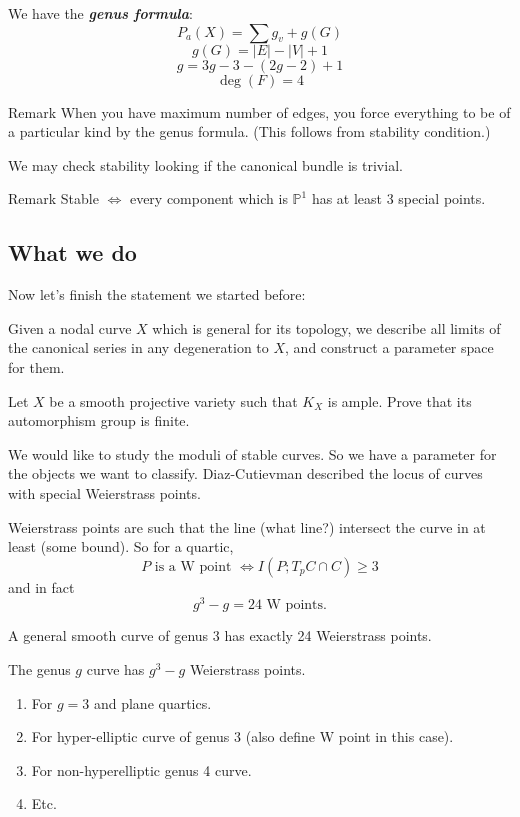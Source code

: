 We have the \textit{\textbf{genus formula}}:
 \[P_a(X)=\sum g_v+g(G)\]
\[g(G)=|E|-|V| +1\]
\[g=3g-3-(2g-2)+1\]
\[\operatorname{deg}(F)=4\]

\begin{thing6}{Remark}\leavevmode
When you have maximum number of edges, you force everything to be of a particular kind by the genus formula. (This follows from stability condition.)
\end{thing6}

\begin{remark}
	We may check stability looking if the canonical bundle is trivial.
\end{remark}

\begin{thing1}{Remark}\leavevmode
	Stable $\iff$ every component which is $\mathbb{P}^1$ has at least 3 special points.
\end{thing1}

\subsection{What we do}

Now let's finish the statement we started before:

Given a nodal curve $X$ which is general for its topology, we describe all limits of the canonical series in any degeneration to $X$, and construct a parameter space for them.

\begin{exercise}
	Let $X$ be a smooth projective variety such that $K_X$ is ample. Prove that its automorphism group is finite.
\end{exercise}



We would like to study the moduli of stable curves. So we have a parameter for the objects we want to classify. Diaz-Cutievman described the locus of curves with special  Weierstrass points.

Weierstrass points are such that the line (what line?) intersect the curve in at least (some bound). So for a quartic,
\[P\text{ is a W point }\iff I(P;T_pC\cap C)\geq 3 \]
and in fact
\[g^3-g=24\text{ W points.}\]

\begin{remark}
	A general smooth curve of genus 3 has exactly 24 Weierstrass points.
\end{remark}

\begin{exercise}\leavevmode 
	The genus $g$ curve has $g^3-g$ Weierstrass points.
\begin{enumerate}[label=\alph*.]
	\item For $g=3$ and plane quartics.
	 \item For hyper-elliptic curve of genus $3$ (also define W point in this case).
\item For non-hyperelliptic genus 4 curve.
\item Etc.
\end{enumerate}
\end{exercise}

